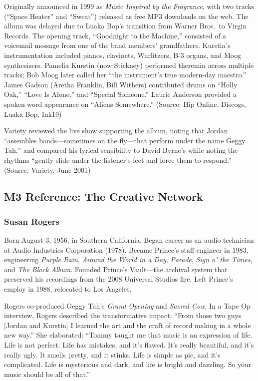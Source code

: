 \documentclass[11pt,letterpaper]{article}
\begin{document}
Originally announced in 1999 as \textit{Music Inspired by the Fragrance}, with two tracks (``Space Heater'' and ``Sweat'') released as free MP3 downloads on the web. The album was delayed due to Luaka Bop's transition from Warner Bros.\ to Virgin Records. The opening track, ``Goodnight to the Machine,'' consisted of a voicemail message from one of the band members' grandfathers. Kurstin's instrumentation included pianos, clavinets, Wurlitzers, B-3 organs, and Moog synthesizers. Pamelia Kurstin (now Stickney) performed theremin across multiple tracks; Bob Moog later called her ``the instrument's true modern-day maestro.'' James Gadson (Aretha Franklin, Bill Withers) contributed drums on ``Holly Oak,'' ``Love Is Alone,'' and ``Special Someone.'' Laurie Anderson provided a spoken-word appearance on ``Aliens Somewhere.'' (Source: Hip Online, Discogs, Luaka Bop, Ink19)

Variety reviewed the live show supporting the album, noting that Jordan ``assembles bands---sometimes on the fly---that perform under the name Geggy Tah,'' and compared his lyrical sensibility to David Byrne's while noting the rhythms ``gently slide under the listener's feet and force them to respond.'' (Source: Variety, June 2001)

\subsection{M3 Reference: The Creative Network}

\subsubsection{Susan Rogers}

Born August 3, 1956, in Southern California. Began career as an audio technician at Audio Industries Corporation (1978). Became Prince's staff engineer in 1983, engineering \textit{Purple Rain}, \textit{Around the World in a Day}, \textit{Parade}, \textit{Sign o' the Times}, and \textit{The Black Album}. Founded Prince's Vault---the archival system that preserved his recordings from the 2008 Universal Studios fire. Left Prince's employ in 1988, relocated to Los Angeles.

Rogers co-produced Geggy Tah's \textit{Grand Opening} and \textit{Sacred Cow}. In a Tape Op interview, Rogers described the transformative impact: ``From those two guys [Jordan and Kurstin] I learned the art and the craft of record making in a whole new way.'' She elaborated: ``Tommy taught me that music is an expression of life. Life is not perfect. Life has mistakes, and it's flawed. It's really beautiful, and it's really ugly. It smells pretty, and it stinks. Life is simple as pie, and it's complicated. Life is mysterious and dark, and life is bright and dazzling. So your music should be all of that.''
\end{document}
